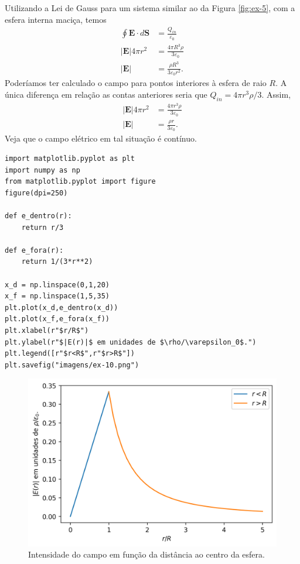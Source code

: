 \documentclass[11pt]{article}
\begin{document}
Utilizando a Lei de Gauss para um sistema similar ao da Figura
\ref{fig:ex-5}, com a esfera interna maciça, temos
\begin{align*}
  \oint \mathbf E\cdot d\mathbf S &= \frac{Q_{in}}{\varepsilon_0}\\ 
  |\mathbf E| 4\pi r^2 &= \frac{4\pi R^3\rho}{3\varepsilon_0}\\
  |\mathbf E| &= \frac{\rho R^3}{3\varepsilon_0r^2}.
\end{align*}
Poderíamos ter calculado o campo para pontos interiores à esfera de raio
\(R\). A única diferença em relação as contas anteriores seria que
\(Q_{in}=4\pi r^3 \rho/3\). Assim,
\begin{align*}
  |\mathbf E| 4\pi r^2 &= \frac{4\pi r^3\rho}{3\varepsilon_0}\\
  |\mathbf E| &= \frac{\rho r}{3\varepsilon_0}.
\end{align*}
Veja que o campo elétrico em tal situação é contínuo. 
\begin{verbatim}
import matplotlib.pyplot as plt
import numpy as np
from matplotlib.pyplot import figure
figure(dpi=250)

def e_dentro(r):
    return r/3

def e_fora(r):
    return 1/(3*r**2)

x_d = np.linspace(0,1,20)
x_f = np.linspace(1,5,35)
plt.plot(x_d,e_dentro(x_d))
plt.plot(x_f,e_fora(x_f))
plt.xlabel(r"$r/R$")
plt.ylabel(r"$|E(r)|$ em unidades de $\rho/\varepsilon_0$.")
plt.legend([r"$r<R$",r"$r>R$"])
plt.savefig("imagens/ex-10.png")
\end{verbatim}
\begin{figure}[h!]
  \centering
  \includegraphics[scale=0.8]{imagens/ex-10.png}
  \caption{Intensidade do campo em função da distância ao centro da esfera.}
\end{figure}
\end{document}
